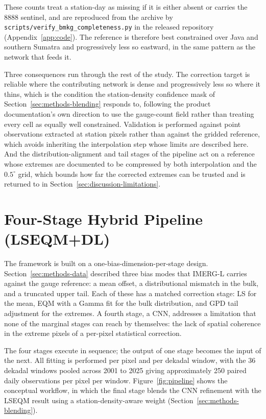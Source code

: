 These counts treat a station-day as missing if it is either absent
or carries the $8888$ sentinel, and are reproduced from the archive
by \texttt{scripts/verify\_bmkg\_completeness.py} in the released
repository (Appendix~\ref{app:code}). The
reference is therefore best constrained over Java and southern
Sumatra and progressively less so eastward, in the same pattern as
the network that feeds it.

Three consequences run through the rest of the study. The
correction target is reliable where the contributing network is
dense and progressively less so where it thins, which is the
condition the station-density confidence mask of
Section~\ref{sec:methods-blending} responds to, following the
product documentation's own direction to use the gauge-count field
rather than treating every cell as equally well constrained.
Validation is performed against point observations extracted at
station pixels rather than against the gridded reference, which
avoids inheriting the interpolation step whose limits are described
here. And the distribution-alignment and tail stages of the
pipeline act on a reference whose extremes are documented to be
compressed by both interpolation and the $0.5^{\circ}$ grid, which
bounds how far the corrected extremes can be trusted and is
returned to in Section~\ref{sec:discussion-limitations}.


\section{Four-Stage Hybrid Pipeline (LSEQM+DL)}\label{sec:methods-pipeline}

The framework is built on a one-bias-dimension-per-stage design.
Section~\ref{sec:methods-data} described three bias modes that
IMERG-L carries against the gauge reference: a mean offset, a
distributional mismatch in the bulk, and a truncated upper tail.
Each of these has a matched correction stage: LS for the mean,
EQM with a Gamma fit for the bulk distribution, and GPD tail
adjustment for the extremes. A fourth stage, a CNN, addresses a
limitation that none of the marginal stages can reach by
themselves: the lack of spatial coherence in the extreme pixels
of a per-pixel statistical correction.

The four stages execute
in sequence; the output of one stage becomes the input of the
next. All fitting is performed per pixel and per dekadal window,
with the 36 dekadal windows pooled across 2001 to 2025 giving
approximately 250 paired daily observations per pixel
per window. Figure~\ref{fig:pipeline} shows the conceptual
workflow, in which the final stage blends the CNN refinement with
the LSEQM result using a station-density-aware weight
(Section~\ref{sec:methods-blending}).

